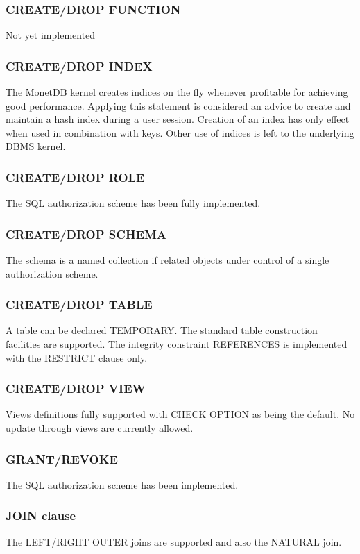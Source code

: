 \documentclass[10pt,twocolumn,fleqn]{article}
\begin{document}
\subsubsection*{CREATE/DROP FUNCTION}
Not yet implemented

\subsubsection*{CREATE/DROP INDEX}

The MonetDB kernel creates indices on the fly whenever profitable for
achieving good performance. Applying this statement is considered
an advice to create and maintain a hash index during a user session.
Creation of an index has only effect when used in combination
with keys. Other use of indices is left to the underlying DBMS kernel.

\subsubsection*{CREATE/DROP ROLE}
The SQL authorization scheme has been fully implemented.

\subsubsection*{CREATE/DROP SCHEMA}
The schema is a named collection if related objects under control of
a single authorization scheme. 

\subsubsection*{CREATE/DROP TABLE}
A table can be declared TEMPORARY. The standard table construction
facilities are supported. The integrity constraint REFERENCES is implemented
with the RESTRICT clause only.

\subsubsection*{CREATE/DROP VIEW}
Views definitions fully supported with CHECK OPTION as being the default.
No update through views are currently allowed.

\subsubsection*{GRANT/REVOKE}
The SQL authorization scheme has been implemented.

\subsubsection*{JOIN clause}
The LEFT/RIGHT OUTER joins are supported and also the NATURAL join.
\end{document}
